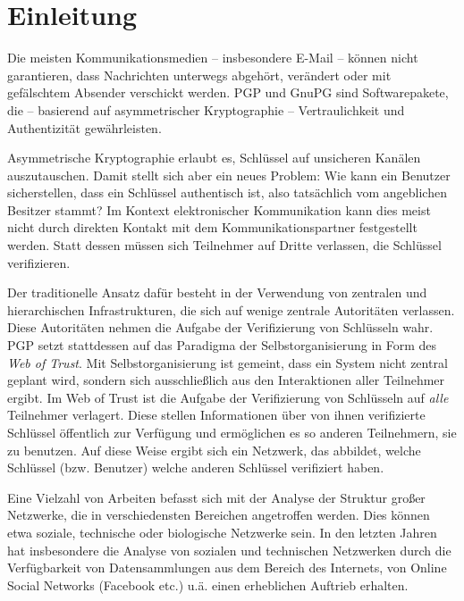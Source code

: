 
\chapter{Einleitung}
\label{ch:Einleitung}

Die meisten Kommunikationsmedien -- insbesondere E-Mail -- können
nicht garantieren, dass Nachrichten unterwegs abgehört, verändert
oder mit gefälschtem Absender verschickt werden. PGP und GnuPG sind
Softwarepakete, die -- basierend auf asymmetrischer Kryptographie --
Vertraulichkeit und Authentizität gewährleisten.

Asymmetrische Kryptographie erlaubt es, Schlüssel auf unsicheren
Kanälen auszutauschen. Damit stellt sich aber ein neues Problem: Wie
kann ein Benutzer sicherstellen, dass ein Schlüssel authentisch ist,
also tatsächlich vom angeblichen Besitzer stammt? Im Kontext
elektronischer Kommunikation kann dies meist nicht durch direkten
Kontakt mit dem Kommunikationspartner festgestellt werden. Statt
dessen müssen sich Teilnehmer auf Dritte verlassen, die Schlüssel
verifizieren.

Der traditionelle Ansatz dafür besteht in der Verwendung von
zentralen und hierarchischen Infrastrukturen, die sich auf wenige
zentrale Autoritäten verlassen. Diese Autoritäten nehmen die
Aufgabe der Verifizierung von Schlüsseln wahr.  PGP setzt
stattdessen auf das Paradigma der Selbstorganisierung in Form des
\emph{Web of Trust}. Mit Selbstorganisierung ist gemeint, dass ein
System nicht zentral geplant wird, sondern sich ausschließlich aus
den Interaktionen aller Teilnehmer ergibt. Im Web of Trust ist die
Aufgabe der Verifizierung von Schlüsseln auf \emph{alle} Teilnehmer
verlagert. Diese stellen Informationen über von ihnen verifizierte
Schlüssel öffentlich zur Verfügung und ermöglichen es so
anderen Teilnehmern, sie zu benutzen. Auf diese Weise ergibt sich ein
Netzwerk, das abbildet, welche Schlüssel (bzw. Benutzer) welche
anderen Schlüssel verifiziert haben.

Eine Vielzahl von Arbeiten befasst sich mit der Analyse der Struktur
großer Netzwerke, die in verschiedensten Bereichen angetroffen
werden. Dies können etwa soziale, technische oder biologische
Netzwerke sein. In den letzten Jahren hat insbesondere die Analyse von
sozialen und technischen Netzwerken durch die Verfügbarkeit von
Datensammlungen aus dem Bereich des Internets, von Online Social
Networks (Facebook etc.) u.ä. einen erheblichen Auftrieb erhalten.

